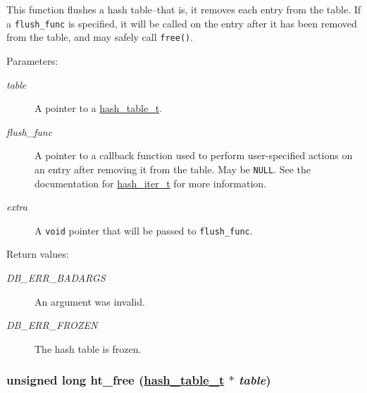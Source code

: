 This function flushes a hash table--that is, it removes each entry from the table. If a {\tt flush\_\-func} is specified, it will be called on the entry after it has been removed from the table, and may safely call {\tt free()}.\begin{Desc}
\item[Parameters: ]\par
\begin{description}
\item[{\em 
table}]A pointer to a \hyperlink{group__dbprim__hash_a0}{hash\_\-table\_\-t}. \item[{\em 
flush\_\-func}]A pointer to a callback function used to perform user-specified actions on an entry after removing it from the table. May be {\tt NULL}. See the documentation for \hyperlink{group__dbprim__hash_a2}{hash\_\-iter\_\-t} for more information. \item[{\em 
extra}]A {\tt void} pointer that will be passed to {\tt flush\_\-func}.\end{description}
\end{Desc}
\begin{Desc}
\item[Return values: ]\par
\begin{description}
\item[{\em 
DB\_\-ERR\_\-BADARGS}]An argument was invalid. \item[{\em 
DB\_\-ERR\_\-FROZEN}]The hash table is frozen. \end{description}
\end{Desc}
\hypertarget{group__dbprim__hash_a14}{
\subsubsection[ht\_\-free]{\setlength{\rightskip}{0pt plus 5cm}unsigned long ht\_\-free (\hyperlink{group__dbprim__hash_a0}{hash\_\-table\_\-t} $\ast$ {\em table})}}
\label{group__dbprim__hash_a14}


